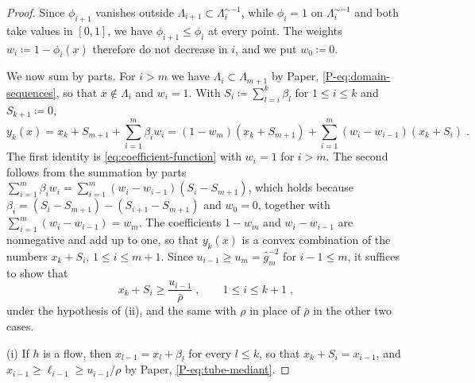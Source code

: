 \documentclass[11pt]{preprint}
\numberwithin{equation}{section}
\theoremstyle{definition}
\theoremstyle{remark}
\theoremstyle{plain}
\begin{document}
\begin{proof}
Since $\phi_{i+1}$ vanishes outside $\Lambda_{i+1} \subset \Lambda_i^{\sim-1}$, while $\phi_i = 1$ on $\Lambda_i^{\sim-1}$ and both take values in $[0, 1]$, we have $\phi_{i+1} \leq \phi_i$ at every point. The weights $w_i \coloneqq 1 - \phi_i(x)$ therefore do not decrease in $i$, and we put $w_0 \coloneqq 0$.

We now sum by parts. For $i > m$ we have $\Lambda_i \subset \Lambda_{m+1}$ by Paper, \eqref{P-eq:domain-sequences}, so that $x \notin \Lambda_i$ and $w_i = 1$. With $S_i \coloneqq \sum_{l=i}^{k}\beta_l$ for $1 \leq i \leq k$ and $S_{k+1} \coloneqq 0$,
\begin{equation}\label{eq:abel-summation}
    y_k(x) = x_k + S_{m+1} + \sum_{i=1}^{m}\beta_iw_i = (1 - w_m)(x_k + S_{m+1}) + \sum_{i=1}^{m}(w_i - w_{i-1})(x_k + S_i)\;.
\end{equation}
The first identity is \eqref{eq:coefficient-function} with $w_i = 1$ for $i > m$. The second follows from the summation by parts $\sum_{i=1}^{m}\beta_iw_i = \sum_{i=1}^{m}(w_i - w_{i-1})(S_i - S_{m+1})$, which holds because $\beta_i = (S_i - S_{m+1}) - (S_{i+1} - S_{m+1})$ and $w_0 = 0$, together with $\sum_{i=1}^{m}(w_i - w_{i-1}) = w_m$. The coefficients $1 - w_m$ and $w_i - w_{i-1}$ are nonnegative and add up to one, so that $y_k(x)$ is a convex combination of the numbers $x_k + S_i$, $1 \leq i \leq m + 1$. Since $u_{i-1} \geq u_m = \hat g_m^{-2}$ for $i - 1 \leq m$, it suffices to show that
\begin{equation}\label{eq:top-down}
    x_k + S_i \geq \frac{u_{i-1}}{\bar\rho}\;,
    \qquad
    1 \leq i \leq k + 1\;,
\end{equation}
under the hypothesis of (ii), and the same with $\rho$ in place of $\bar\rho$ in the other two cases.

(i) If $h$ is a flow, then $x_{l-1} = x_l + \beta_l$ for every $l \leq k$, so that $x_k + S_i = x_{i-1}$, and $x_{i-1} \geq \ell_{i-1} \geq u_{i-1}/\rho$ by Paper, \eqref{P-eq:tube-mediant}.


\end{proof}
\end{document}
